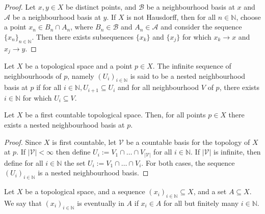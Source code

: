 \begin{proof}
  Let \(x, y \in X\) be distinct points, and \(\mathcal B\) be a neighbourhood
  basis at \(x\) and \(\mathcal A\) be a neighbourhood basis at \(y\). If \(X\) 
  is not Hausdorff, then for all \(n \in \mathbb{N}\), choose a point \(x_n \in
  B_n \cap A_n\), where \(B_n \in \mathcal B\) and \(A_n \in \mathcal A\) and
  consider the sequence \(\{x_n\}_{n \in \mathbb{N}}\). Then there exists
  subsequences \(\{x_k\}\) and \(\{x_j\}\) for which \(x_k \to x\) and \(x_j \to
  y\).
\end{proof}

\begin{definition}
  Let \(X\) be a topological space and a point \(p \in X\). The infinite sequence
  of neighbourhoods of \(p\), namely \((U_i)_{i \in \mathbb{N}}\) is said to be
  a nested neighbourhood basis at \(p\) if for all \(i \in \mathbb{N}, U_{i+1}
  \subseteq U_i\) and for all neighbourhood \(V\) of \(p\), there exists \(i \in
  \mathbb{N}\) for which \(U_i \subseteq V\).
\end{definition}

\begin{lemma}
  Let \(X\) be a first countable topological space. Then, for all points \(p \in
  X\) there exists a nested neighbourhood basis at \(p\).
\end{lemma}

\begin{proof}
  Since \(X\) is first countable, let \(\mathcal V\) be a countable basis for the
  topology of \(X\) at \(p\). If \(|\mathcal V| < \infty\) then define \(U_i :=
  V_1 \cap \dots \cap V_{|\mathcal V|}\) for all \(i \in \mathbb{N}\). If
  \(|\mathcal V|\) is infinite, then define for all \(i \in \mathbb{N}\) the
  set \(U_i := V_1 \cap \dots \cap V_i\). For both cases, the sequence
  \((U_i)_{i \in \mathbb{N}}\) is a nested neighbourhood basis.
\end{proof}

\begin{definition}[Eventually in]
  Let \(X\) be a topological space, and a sequence \((x_i)_{i \in \mathbb{N}}
  \subseteq X\), and a set \(A \subseteq X\). We say that \((x_i)_{i \in
  \mathbb{N}}\) is eventually in \(A\) if \(x_i \in A\) for all but finitely
  many \(i \in \mathbb{N}\).
\end{definition}

